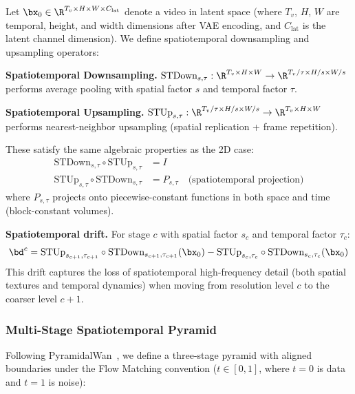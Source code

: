 Let $\bx_0 \in \R^{T_v \times H \times W \times C_{\text{lat}}}$ denote a video in latent space (where $T_v$, $H$, $W$ are temporal, height, and width dimensions after VAE encoding, and $C_{\text{lat}}$ is the latent channel dimension).
We define spatiotemporal downsampling and upsampling operators:

\textbf{Spatiotemporal Downsampling.} $\text{STDown}_{s,\tau}: \R^{T_v \times H \times W} \to \R^{T_v/\tau \times H/s \times W/s}$ performs average pooling with spatial factor $s$ and temporal factor $\tau$.

\textbf{Spatiotemporal Upsampling.} $\text{STUp}_{s,\tau}: \R^{T_v/\tau \times H/s \times W/s} \to \R^{T_v \times H \times W}$ performs nearest-neighbor upsampling (spatial replication + frame repetition).

These satisfy the same algebraic properties as the 2D case:
\begin{align}
    \text{STDown}_{s,\tau} \circ \text{STUp}_{s,\tau} &= I \\
    \text{STUp}_{s,\tau} \circ \text{STDown}_{s,\tau} &= P_{s,\tau} \quad \text{(spatiotemporal projection)}
\end{align}
where $P_{s,\tau}$ projects onto piecewise-constant functions in both space and time (block-constant volumes).

\textbf{Spatiotemporal drift.} For stage $c$ with spatial factor $s_c$ and temporal factor $\tau_c$:
\begin{equation}
    \bd^c = \text{STUp}_{s_{c+1},\tau_{c+1}} \circ \text{STDown}_{s_{c+1},\tau_{c+1}}(\bx_0) - \text{STUp}_{s_c,\tau_c} \circ \text{STDown}_{s_c,\tau_c}(\bx_0)
    \label{eq:st_drift}
\end{equation}
This drift captures the loss of spatiotemporal high-frequency detail (both spatial textures and temporal dynamics) when moving from resolution level $c$ to the coarser level $c+1$.

\subsubsection{Multi-Stage Spatiotemporal Pyramid}

Following PyramidalWan~\citep{liu2025pyramidalwan}, we define a three-stage pyramid with aligned boundaries under the Flow Matching convention ($t \in [0, 1]$, where $t=0$ is data and $t=1$ is noise):

